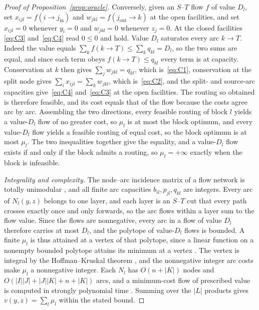 \begin{proof}[Proof of Proposition~\ref{prop:oracle}]
Conversely, given an $S$--$T$ flow $f$ of value $D_l$, set
$x_{ijl}=f(i\!\to\! j_{\mathrm{in}})$ and
$w_{jkl}=f(j_{\mathrm{out}}\!\to\! k)$ at the open facilities, and set
$x_{ijl}=0$ whenever $y_i=0$ and $w_{jkl}=0$ whenever $z_j=0$. At the
closed facilities \eqref{eq:C3} and~\eqref{eq:C4} read $0\le 0$ and
hold. Value $D_l$ saturates every arc $k\!\to\! T$. Indeed the value
equals $\sum_k f(k\!\to\! T)\le\sum_k q_{kl}=D_l$, so the two sums are
equal, and since each term obeys $f(k\!\to\! T)\le q_{kl}$ every term is
at capacity. Conservation at $k$ then gives $\sum_j w_{jkl}=q_{kl}$,
which is~\eqref{eq:C1}, conservation at the split node gives
$\sum_i x_{ijl}=\sum_k w_{jkl}$, which is~\eqref{eq:C2}, and the split-
and source-arc capacities give~\eqref{eq:C4} and~\eqref{eq:C3} at the
open facilities. The routing so obtained is therefore feasible, and its
cost equals that of the flow because the costs agree arc by arc.
Assembling the two directions, every feasible routing of block $l$
yields a value-$D_l$ flow of no greater cost, so $\mu_l$ is at most the
block optimum, and every value-$D_l$ flow yields a feasible routing of
equal cost, so the block optimum is at most $\mu_l$. The two inequalities
together give the equality, and a value-$D_l$ flow exists if and only if
the block admits a routing, so $\mu_l=+\infty$ exactly when the block is
infeasible.

\emph{Integrality and complexity.} The node--arc incidence matrix of a
flow network is totally unimodular \citep{Schrijver1986}, and all finite
arc capacities $b_{il},p_{jl},q_{kl}$ are integers. Every arc of
$N_l(y,z)$ belongs to one layer, and each layer is an $S$--$T$ cut that
every path crosses exactly once and only forwards, so the arc flows
within a layer sum to the flow value. Since the flows are nonnegative,
every arc in a flow of value $D_l$ therefore carries at most $D_l$, and
the polytope of value-$D_l$ flows is bounded. A finite $\mu_l$ is thus
attained at a vertex of that polytope, since a linear function on a
nonempty bounded polytope attains its minimum at a vertex
\citep{Schrijver1986}. The vertex is integral by the Hoffman--Kruskal
theorem \citep{Schrijver1986}, and the nonnegative integer arc costs
make $\mu_l$ a nonnegative integer. Each $N_l$ has $O(n+|K|)$ nodes and
$O(|I||J|+|J||K|+n+|K|)$ arcs, and a minimum-cost flow of prescribed value is
computed in strongly polynomial time \citep{Orlin1993}. Summing over the
$|L|$ products gives $v(y,z)=\sum_l\mu_l$ within the stated bound.
\end{proof}

